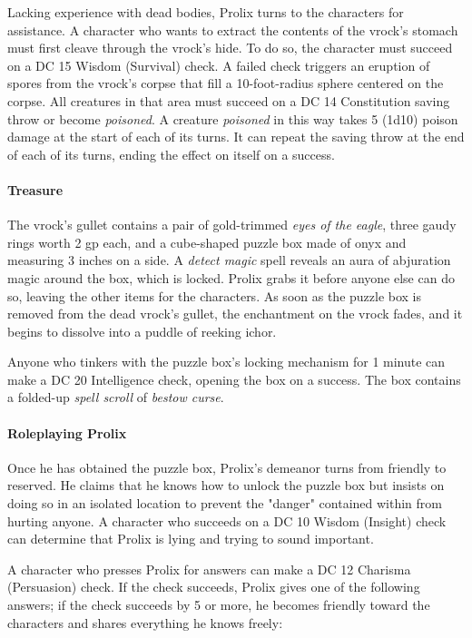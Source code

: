 \documentclass[letterpaper, 11pt, bg=full, twocolumn]{dndbook}
\begin{document}
Lacking experience with dead bodies, Prolix turns to the characters for assistance. A character who wants to extract the contents of the vrock's stomach must first cleave through the vrock's hide. To do so, the character must succeed on a DC 15 Wisdom (Survival) check. A failed check triggers an eruption of spores from the vrock's corpse that fill a 10-foot-radius sphere centered on the corpse. All creatures in that area must succeed on a DC 14 Constitution saving throw or become \textit{poisoned}. A creature \textit{poisoned} in this way takes 5 (1d10) poison damage at the start of each of its turns. It can repeat the saving throw at the end of each of its turns, ending the effect on itself on a success.

\paragraph{Treasure}

The vrock's gullet contains a pair of gold-trimmed \textit{eyes of the eagle}, three gaudy rings worth 2 gp each, and a cube-shaped puzzle box made of onyx and measuring 3 inches on a side. A \textit{detect magic} spell reveals an aura of abjuration magic around the box, which is locked. Prolix grabs it before anyone else can do so, leaving the other items for the characters. As soon as the puzzle box is removed from the dead vrock's gullet, the enchantment on the vrock fades, and it begins to dissolve into a puddle of reeking ichor.

Anyone who tinkers with the puzzle box's locking mechanism for 1 minute can make a DC 20 Intelligence check, opening the box on a success. The box contains a folded-up \textit{spell scroll} of \textit{bestow curse}.


\paragraph{Roleplaying Prolix}

Once he has obtained the puzzle box, Prolix's demeanor turns from friendly to reserved. He claims that he knows how to unlock the puzzle box but insists on doing so in an isolated location to prevent the "danger" contained within from hurting anyone. A character who succeeds on a DC 10 Wisdom (Insight) check can determine that Prolix is lying and trying to sound important.

A character who presses Prolix for answers can make a DC 12 Charisma (Persuasion) check. If the check succeeds, Prolix gives one of the following answers; if the check succeeds by 5 or more, he becomes friendly toward the characters and shares everything he knows freely:
\end{document}
